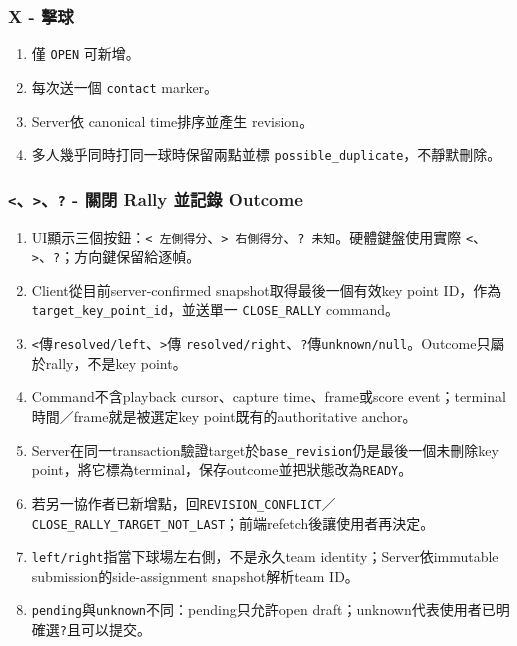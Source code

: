 \documentclass[
  9pt,
  a4paper,
]{article}
\providecommand{\tightlist}{%
  \setlength{\itemsep}{0pt}\setlength{\parskip}{0pt}}
\begin{document}
\subsubsection{X - 擊球}\label{x---ux64caux7403}

\begin{enumerate}
\def\labelenumi{\arabic{enumi}.}
\tightlist
\item
  僅 \texttt{OPEN} 可新增。
\item
  每次送一個 \texttt{contact} marker。
\item
  Server依 canonical time排序並產生 revision。
\item
  多人幾乎同時打同一球時保留兩點並標
  \texttt{possible\_\allowbreak{}duplicate}，不靜默刪除。
\end{enumerate}

\subsubsection{\texorpdfstring{\texttt{\textless{}}、\texttt{\textgreater{}}、\texttt{?}
- 關閉 Rally 並記錄 Outcome}{\textless、\textgreater、? - 關閉 Rally 並記錄 Outcome}}

\begin{enumerate}
\def\labelenumi{\arabic{enumi}.}
\tightlist
\item
  UI顯示三個按鈕：\texttt{\textless{}\ 左側得分}、\texttt{\textgreater{}\ 右側得分}、\texttt{?\ 未知}。硬體鍵盤使用實際
  \texttt{\textless{}}、\texttt{\textgreater{}}、\texttt{?}；方向鍵保留給逐幀。
\item
  Client從目前server-confirmed snapshot取得最後一個有效key point ID，作為
  \texttt{target\_\allowbreak{}key\_\allowbreak{}point\_\allowbreak{}id}，並送單一
  \texttt{CLOSE\_\allowbreak{}RALLY} command。
\item
  \texttt{\textless{}}傳\texttt{resolved/left}、\texttt{\textgreater{}}傳
  \texttt{resolved/right}、\texttt{?}傳\texttt{unknown/null}。Outcome只屬於rally，不是key point。
\item
  Command不含playback cursor、capture time、frame或score event；terminal時間／frame就是被選定key point既有的authoritative anchor。
\item
  Server在同一transaction驗證target於\texttt{base\_\allowbreak{}revision}仍是最後一個未刪除key point，將它標為terminal，保存outcome並把狀態改為\texttt{READY}。
\item
  若另一協作者已新增點，回\texttt{REVISION\_\allowbreak{}CONFLICT}／
  \texttt{CLOSE\_\allowbreak{}RALLY\_\allowbreak{}TARGET\_\allowbreak{}NOT\_\allowbreak{}LAST}；前端refetch後讓使用者再決定。
\item
  \texttt{left/right}指當下球場左右側，不是永久team identity；Server依immutable submission的side-assignment snapshot解析team ID。
\item
  \texttt{pending}與\texttt{unknown}不同：pending只允許open draft；unknown代表使用者已明確選\texttt{?}且可以提交。
\end{enumerate}
\end{document}
